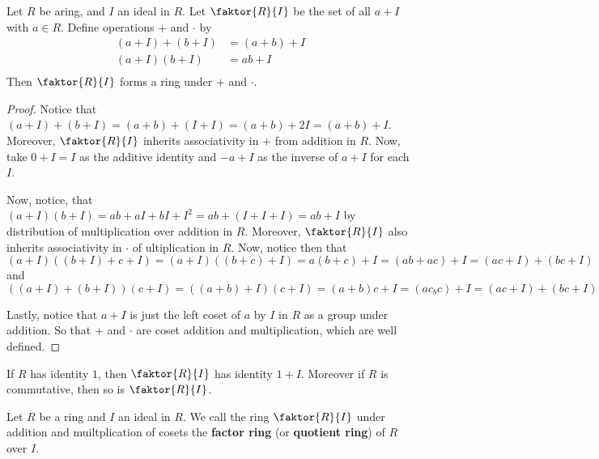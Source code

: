 \begin{theorem}\label{1.3.3}
    Let $R$ be aring, and $I$ an ideal in $R$. Let  $\faktor{R}{I}$ be the set
    of all $a+I$ with  $a \in R$. Define operations $+$ and $\cdot$ by
    \begin{align*}
        (a+I)+(b+I) &=  (a+b)+I \\
        (a+I)(b+I)  &=  ab+I    \\
    \end{align*}
    Then $\faktor{R}{I}$ forms a ring under  $+$ and  $\cdot$.
\end{theorem}
\begin{proof}
    Notice that $(a+I)+(b+I)=(a+b)+(I+I)=(a+b)+2I=(a+b)+I$. Moreover,
    $\faktor{R}{I}$ inherits associativity in $+$ from addition in $R$. Now,
    take $0+I=I$ as the additive identity and  $-a+I$ as the inverse of  $a+I$
    for each  $I$.

    Now, notice, that  $(a+I)(b+I)=ab+aI+bI+I^2=ab+(I+I+I)=ab+I$ by distribution
    of multiplication over addition in $R$. Moreover,  $\faktor{R}{I}$ also
    inherits associativity in $\cdot$ of ultiplication in $R$. Now, notice then
    that
    \begin{equation*}
        (a+I)((b+I)+c+I)=(a+I)((b+c)+I)=a(b+c)+I=(ab+ac)+I=(ac+I)+(bc+I)
    \end{equation*}
    and
    \begin{equation*}
        ((a+I)+(b+I))(c+I)=((a+b)+I)(c+I)=(a+b)c+I=(ac_bc)+I=(ac+I)+(bc+I)
    \end{equation*}

    Lastly, notice that $a+I$ is just the left coset of  $a$ by  $I$ in $R$ as a
    group under addition. So that $+$ and  $\cdot$ are coset addition and
    multiplication, which are well defined.
\end{proof}
\begin{corollary}
    If $R$ has identity $1$, then $\faktor{R}{I}$ has identity $1+I$. Moreover
    if  $R$ is commutative, then so is  $\faktor{R}{I}$.
\end{corollary}

\begin{definition}
    Let $R$ be a ring and $I$ an ideal in $R$. We call the ring $\faktor{R}{I}$
    under addition and muiltplication of cosets the \textbf{factor ring} (or
    \textbf{quotient ring}) of $R$ over  $I$.
\end{definition}

